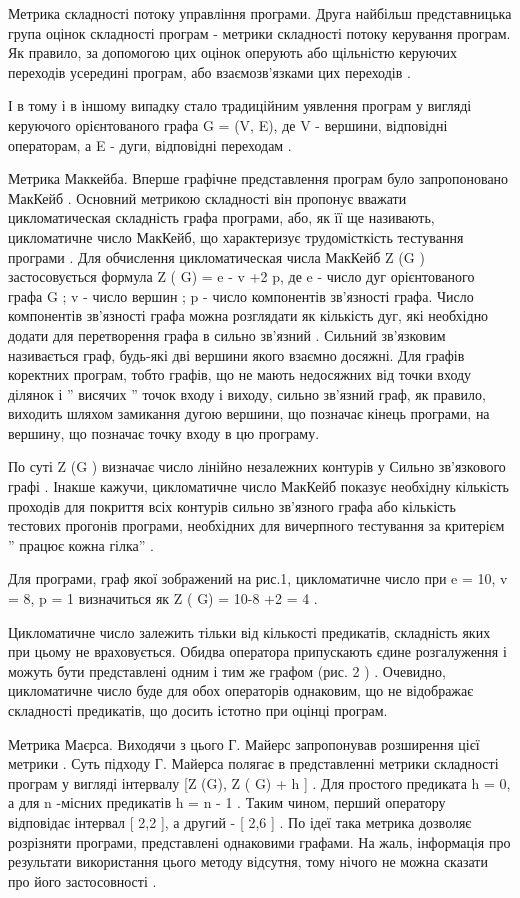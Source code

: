 Метрика складності потоку управління програми.
Друга найбільш представницька група оцінок складності програм - метрики складності потоку керування програм. Як правило, за допомогою цих оцінок оперують або щільністю керуючих переходів усередині програм, або взаємозв'язками цих переходів .

І в тому і в іншому випадку стало традиційним уявлення програм у вигляді керуючого орієнтованого графа G = (V, E), де V - вершини, відповідні операторам, а E - дуги, відповідні переходам .

Метрика Маккейба.
Вперше графічне представлення програм було запропоновано МакКейб . Основний метрикою складності він пропонує вважати цикломатическая складність графа програми, або, як її ще називають, цикломатичне число МакКейб, що характеризує трудомісткість тестування програми .
Для обчислення цикломатическая числа МакКейб Z (G ) застосовується формула
Z ( G) = e - v +2 p,
де e - число дуг орієнтованого графа G ;
v - число вершин ;
p - число компонентів зв'язності графа.
Число компонентів зв'язності графа можна розглядати як кількість дуг, які необхідно додати для перетворення графа в сильно зв'язний . Сильний зв'язковим називається граф, будь-які дві вершини якого взаємно досяжні. Для графів коректних програм, тобто графів, що не мають недосяжних від точки входу ділянок і '' висячих '' точок входу і виходу, сильно зв'язний граф, як правило, виходить шляхом замикання дугою вершини, що позначає кінець програми, на вершину, що позначає точку входу в цю програму.

По суті Z (G ) визначає число лінійно незалежних контурів у Сильно зв'язкового графі . Інакше кажучи, цикломатичне число МакКейб показує необхідну кількість проходів для покриття всіх контурів сильно зв'язного графа або кількість тестових прогонів програми, необхідних для вичерпного тестування за критерієм '' працює кожна гілка'' .

Для програми, граф якої зображений на рис.1, цикломатичне число при e = 10, v = 8, p = 1 визначиться як Z ( G) = 10-8 +2 = 4 .

Цикломатичне число залежить тільки від кількості предикатів, складність яких при цьому не враховується. 
Обидва оператора припускають єдине розгалуження і можуть бути представлені одним і тим же графом (рис. 2 ) . Очевидно, цикломатичне число буде для обох операторів однаковим, що не відображає складності предикатів, що досить істотно при оцінці програм.

Метрика Маєрса.
Виходячи з цього Г. Майерс запропонував розширення цієї метрики . Суть підходу Г. Майерса полягає в представленні метрики складності програм у вигляді інтервалу {[}Z (G), Z ( G) + h {]} . Для простого предиката h = 0, а для n -місних предикатів h = n - 1 . Таким чином, перший оператору відповідає інтервал {[} 2,2 {]}, а другий - {[} 2,6 {]} .
По ідеї така метрика дозволяє розрізняти програми, представлені однаковими графами. На жаль, інформація про результати використання цього методу відсутня, тому нічого не можна сказати про його застосовності .

